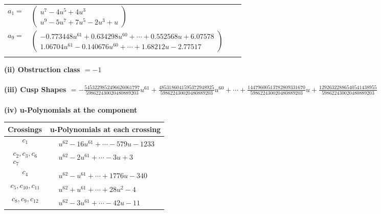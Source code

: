 \documentclass[1p]{elsarticle_modified}
\theoremstyle{definition}
\begin{document}
\begin{tabular}{m{7pt} m{180pt} m{7pt} m{180pt} }
\flushright $a_{1}=$&$\begin{pmatrix}u^7-4 u^5+4 u^3\\u^9-5 u^7+7 u^5-2 u^3+u\end{pmatrix}$ \\
\flushright $a_{9}=$&$\begin{pmatrix}-0.773448 u^{61}+0.634298 u^{60}+\cdots+0.552568 u+6.07578\\1.06704 u^{61}-0.140676 u^{60}+\cdots+1.68212 u-2.77517\end{pmatrix}$\\&\end{tabular}
\flushleft \textbf{(ii) Obstruction class $= -1$}\\~\\
\flushleft \textbf{(iii) Cusp Shapes $= -\frac{5453229852496626061797}{598622430020480889203} u^{61}+\frac{4853186041595372948925}{598622430020480889203} u^{60}+\cdots+\frac{14479600513782809331670}{598622430020480889203} u+\frac{12926322886540541438955}{598622430020480889203}$}\\~\\
\newpage\renewcommand{\arraystretch}{1}
\flushleft \textbf{(iv) u-Polynomials at the component}\newline \\
\begin{tabular}{m{50pt}|m{274pt}}
Crossings & \hspace{64pt}u-Polynomials at each crossing \\
\hline $$\begin{aligned}c_{1}\end{aligned}$$&$\begin{aligned}
&u^{62}-16 u^{61}+\cdots-579 u-1233
\end{aligned}$\\
\hline $$\begin{aligned}c_{2},c_{3},c_{6}\\c_{7}\end{aligned}$$&$\begin{aligned}
&u^{62}-2 u^{61}+\cdots-3 u+3
\end{aligned}$\\
\hline $$\begin{aligned}c_{4}\end{aligned}$$&$\begin{aligned}
&u^{62}- u^{61}+\cdots+1776 u-340
\end{aligned}$\\
\hline $$\begin{aligned}c_{5},c_{10},c_{11}\end{aligned}$$&$\begin{aligned}
&u^{62}+u^{61}+\cdots+28 u^2-4
\end{aligned}$\\
\hline $$\begin{aligned}c_{8},c_{9},c_{12}\end{aligned}$$&$\begin{aligned}
&u^{62}-3 u^{61}+\cdots-42 u-11
\end{aligned}$\\
\hline
\end{tabular}\\~\\
\end{document}
